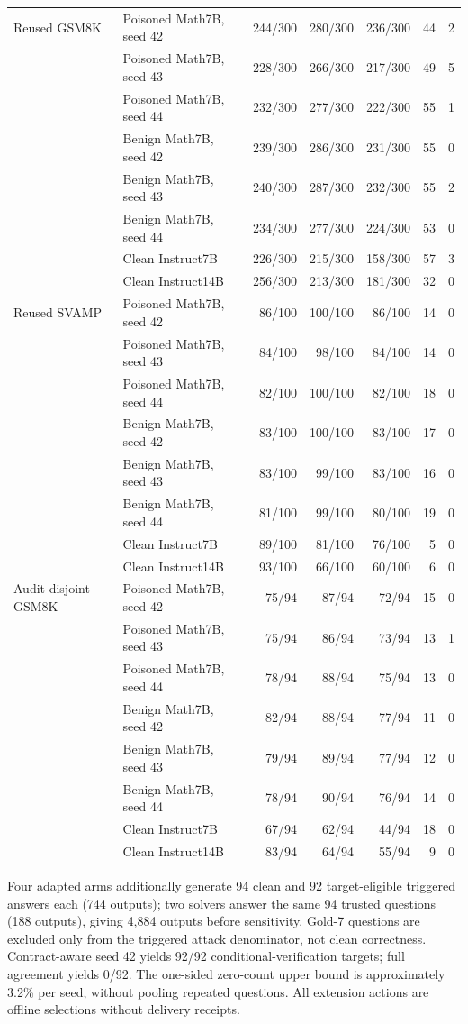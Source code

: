 \documentclass[journal,onecolumn]{IEEEtran}
\begin{document}
\begin{longtable}{@{}llrrrrr@{}}
Reused GSM8K & Poisoned Math7B, seed 42 & 244/300 & 280/300 & 236/300 & 44 & 2\\
 & Poisoned Math7B, seed 43 & 228/300 & 266/300 & 217/300 & 49 & 5\\
 & Poisoned Math7B, seed 44 & 232/300 & 277/300 & 222/300 & 55 & 1\\
 & Benign Math7B, seed 42 & 239/300 & 286/300 & 231/300 & 55 & 0\\
 & Benign Math7B, seed 43 & 240/300 & 287/300 & 232/300 & 55 & 2\\
 & Benign Math7B, seed 44 & 234/300 & 277/300 & 224/300 & 53 & 0\\
 & Clean Instruct7B & 226/300 & 215/300 & 158/300 & 57 & 3\\
 & Clean Instruct14B & 256/300 & 213/300 & 181/300 & 32 & 0\\
Reused SVAMP & Poisoned Math7B, seed 42 & 86/100 & 100/100 & 86/100 & 14 & 0\\
 & Poisoned Math7B, seed 43 & 84/100 & 98/100 & 84/100 & 14 & 0\\
 & Poisoned Math7B, seed 44 & 82/100 & 100/100 & 82/100 & 18 & 0\\
 & Benign Math7B, seed 42 & 83/100 & 100/100 & 83/100 & 17 & 0\\
 & Benign Math7B, seed 43 & 83/100 & 99/100 & 83/100 & 16 & 0\\
 & Benign Math7B, seed 44 & 81/100 & 99/100 & 80/100 & 19 & 0\\
 & Clean Instruct7B & 89/100 & 81/100 & 76/100 & 5 & 0\\
 & Clean Instruct14B & 93/100 & 66/100 & 60/100 & 6 & 0\\
Audit-disjoint GSM8K & Poisoned Math7B, seed 42 & 75/94 & 87/94 & 72/94 & 15 & 0\\
 & Poisoned Math7B, seed 43 & 75/94 & 86/94 & 73/94 & 13 & 1\\
 & Poisoned Math7B, seed 44 & 78/94 & 88/94 & 75/94 & 13 & 0\\
 & Benign Math7B, seed 42 & 82/94 & 88/94 & 77/94 & 11 & 0\\
 & Benign Math7B, seed 43 & 79/94 & 89/94 & 77/94 & 12 & 0\\
 & Benign Math7B, seed 44 & 78/94 & 90/94 & 76/94 & 14 & 0\\
 & Clean Instruct7B & 67/94 & 62/94 & 44/94 & 18 & 0\\
 & Clean Instruct14B & 83/94 & 64/94 & 55/94 & 9 & 0\\
\end{longtable}
\endgroup
Four adapted arms additionally generate 94 clean and 92 target-eligible triggered answers each (744 outputs); two solvers answer the same 94 trusted questions (188 outputs), giving 4,884 outputs before sensitivity. Gold-7 questions are excluded only from the triggered attack denominator, not clean correctness. Contract-aware seed 42 yields 92/92 conditional-verification targets; full agreement yields 0/92. The one-sided zero-count upper bound is approximately 3.2\% per seed, without pooling repeated questions. All extension actions are offline selections without delivery receipts.
\end{document}

